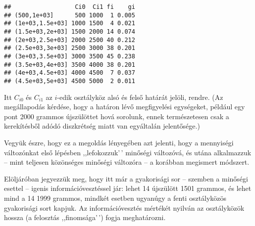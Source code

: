 \documentclass[
]{book}
\newenvironment{Shaded}{\begin{snugshade}}{\end{snugshade}}
\newcommand{\AttributeTok}[1]{\textcolor[rgb]{0.77,0.63,0.00}{#1}}
\newcommand{\DecValTok}[1]{\textcolor[rgb]{0.00,0.00,0.81}{#1}}
\newcommand{\FunctionTok}[1]{\textcolor[rgb]{0.00,0.00,0.00}{#1}}
\newcommand{\NormalTok}[1]{#1}
\newcommand{\OtherTok}[1]{\textcolor[rgb]{0.56,0.35,0.01}{#1}}
\newcommand{\SpecialCharTok}[1]{\textcolor[rgb]{0.00,0.00,0.00}{#1}}
\begin{document}
\begin{Shaded}
\end{Shaded}

\begin{verbatim}
##                  Ci0  Ci1 fi    gi
## (500,1e+03]      500 1000  1 0.005
## (1e+03,1.5e+03] 1000 1500  4 0.021
## (1.5e+03,2e+03] 1500 2000 14 0.074
## (2e+03,2.5e+03] 2000 2500 40 0.212
## (2.5e+03,3e+03] 2500 3000 38 0.201
## (3e+03,3.5e+03] 3000 3500 45 0.238
## (3.5e+03,4e+03] 3500 4000 38 0.201
## (4e+03,4.5e+03] 4000 4500  7 0.037
## (4.5e+03,5e+03] 4500 5000  2 0.011
\end{verbatim}

Itt \(C_{i0}\) és \(C_{i1}\) az \(i\)-edik osztályköz alsó és felső határát jelöli, rendre. (Az megállapodás kérdése, hogy a határon lévő megfigyelési egységeket, például egy pont 2000 grammos újszülöttet hová sorolunk, ennek természetesen csak a kerekítésből adódó diszkrétség miatt van egyáltalán jelentősége.)

Vegyük észre, hogy ez a megoldás lényegében azt jelenti, hogy a mennyiségi változónkat első lépésben ,,lefokozzuk'\,' minőségi változóvá, és utána alkalmazzuk -- mint teljesen közönséges minőségi változóra -- a korábban megismert módszert.

Elöljáróban jegyezzük meg, hogy itt már a gyakorisági sor -- szemben a minőségi esettel -- igenis információvesztéssel jár: lehet 14 újszülött 1501 grammos, és lehet mind a 14 1999 grammos, mindkét esetben ugyanúgy a fenti osztályközös gyakorisági sort kapjuk. Az információvesztés mértékét nyilván az osztályközök hossza (a felosztás ,,finomsága'\,') fogja meghatározni.
\end{document}
